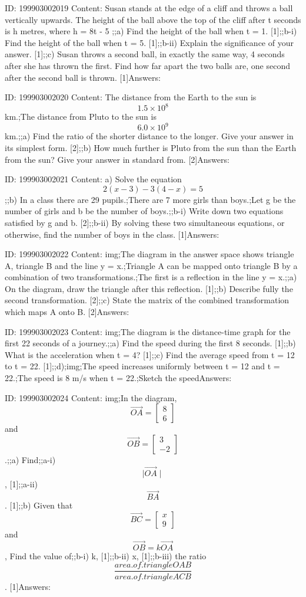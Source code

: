 \documentclass{article}
\begin{document}
ID: 199903002019
Content:
Susan stands at the edge of a cliff and throws a ball vertically upwards. The height of the ball above the top of the cliff after t seconds is h metres, where h = 8t - 5 ;;a) Find the height of the ball when t = 1. [1];;b-i) Find the height of the ball when t = 5. [1];;b-ii) Explain the significance of your answer. [1];;c) Susan throws a second ball, in exactly the same way, 4 seconds after she has thrown the first. Find how far apart the two balls are, one second after the second ball is thrown. [1]Answers:

ID: 199903002020
Content:
The distance from the Earth to the sun is $$1.5 \times 10^8$$km.;The distance from Pluto to the sun is $$6.0 \times 10^9$$ km.;;a) Find the ratio of the shorter distance to the longer. Give your answer in its simplest form. [2];;b) How much further is Pluto from the sun than the Earth from the sun? Give your answer in standard from. [2]Answers:

ID: 199903002021
Content:
a) Solve the equation $$2(x -3) - 3(4 - x) = 5$$ ;;b) In a class there are 29 pupils.;There are 7 more girls than boys.;Let g be the number of girls and b be the number of boys.;;b-i) Write down two equations satisfied by g and b. [2];;b-ii) By solving these two simultaneous equations, or otherwise, find the number of boys in the class. [1]Answers:

ID: 199903002022
Content:
img;The diagram in the answer space shows triangle A, triangle B and the line y = x.;Triangle A can be mapped onto triangle B by a combination of two transformations.;The first is a reflection in the line y = x.;;a) On the diagram, draw the triangle after this reflection. [1];;b) Describe fully the second transformation. [2];;c) State the matrix of the combined transformation which maps A onto B. [2]Answers:

ID: 199903002023
Content:
img;The diagram is the distance-time graph for the first 22 seconds of a journey.;;a) Find the speed during the first 8 seconds. [1];;b) What is the acceleration when t = 4? [1];;c) Find the average speed from t = 12 to t = 22. [1];;d);img;The speed increases uniformly between t = 12 and t = 22.;The speed is 8 m/s when t = 22.;Sketch the speedAnswers:

ID: 199903002024
Content:
img;In the diagram, $$\vec{OA} = \begin{bmatrix}8\\6\end{bmatrix}$$ and $$\vec{OB} = \begin{bmatrix}3\\-2\end{bmatrix}$$.;;a) Find;;a-i) $$\mid\vec{OA}\mid$$, [1];;a-ii) $$\vec{BA}$$. [1];;b) Given that $$\vec{BC} = \begin{bmatrix}x\\9\end{bmatrix}$$ and $$\vec{OB} = k \vec{OA}$$, Find the value of;;b-i) k, [1];;b-ii) x, [1];;b-iii) the ratio $$\frac{area.of.triangle OAB}{area.of.triangle ACB}$$. [1]Answers:
\end{document}
